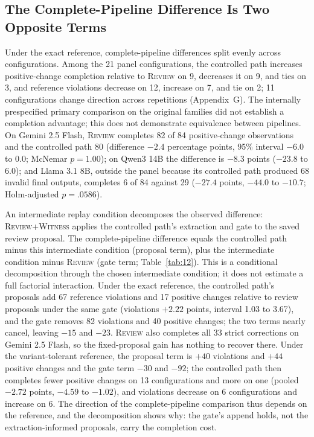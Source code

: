 \documentclass[acmsmall,review]{acmart}
\newcommand{\witness}{\textsc{Witness}}
\newcommand{\review}{\textsc{Review}}
\begin{document}
\subsection{The Complete-Pipeline Difference Is Two Opposite Terms}\label{sec:pipeline}
Under the exact reference, complete-pipeline differences split evenly across configurations. Among the 21 panel configurations, the controlled path increases positive-change completion relative to \review{} on 9, decreases it on 9, and ties on 3, and reference violations decrease on 12, increase on 7, and tie on 2; 11 configurations change direction across repetitions (Appendix~G). The internally prespecified primary comparison on the original families did not establish a completion advantage; this does not demonstrate equivalence between pipelines. On Gemini 2.5 Flash, \review{} completes 82 of 84 positive-change observations and the controlled path 80 (difference $-2.4$ percentage points, 95\% interval $-6.0$ to $0.0$; McNemar $p=1.00$); on Qwen3 14B the difference is $-8.3$ points ($-23.8$ to $6.0$); and Llama 3.1 8B, outside the panel because its controlled path produced 68 invalid final outputs, completes 6 of 84 against 29 ($-27.4$ points, $-44.0$ to $-10.7$; Holm-adjusted $p=.0586$).

An intermediate replay condition decomposes the observed difference: \review{}+\witness{} applies the controlled path's extraction and gate to the saved review proposal. The complete-pipeline difference equals the controlled path minus this intermediate condition (proposal term), plus the intermediate condition minus \review{} (gate term; Table~\ref{tab:12}). This is a conditional decomposition through the chosen intermediate condition; it does not estimate a full factorial interaction. Under the exact reference, the controlled path's proposals add 67 reference violations and 17 positive changes relative to review proposals under the same gate (violations $+2.22$ points, interval 1.03 to 3.67), and the gate removes 82 violations and 40 positive changes; the two terms nearly cancel, leaving $-15$ and $-23$. \review{} also completes all 33 strict corrections on Gemini 2.5 Flash, so the fixed-proposal gain has nothing to recover there. Under the variant-tolerant reference, the proposal term is $+40$ violations and $+44$ positive changes and the gate term $-30$ and $-92$; the controlled path then completes fewer positive changes on 13 configurations and more on one (pooled $-2.72$ points, $-4.59$ to $-1.02$), and violations decrease on 6 configurations and increase on 6. The direction of the complete-pipeline comparison thus depends on the reference, and the decomposition shows why: the gate's append holds, not the extraction-informed proposals, carry the completion cost.
\end{document}
